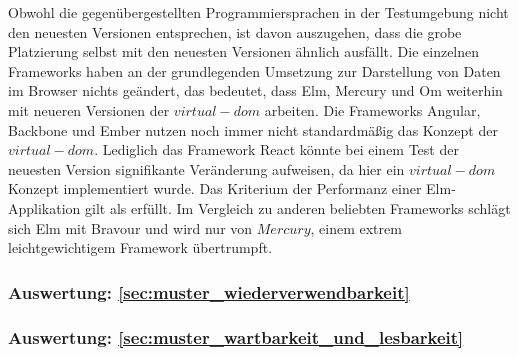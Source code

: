 Obwohl die gegenübergestellten Programmiersprachen in der Testumgebung nicht den neuesten Versionen entsprechen, ist davon auszugehen, dass die grobe Platzierung selbst mit den neuesten Versionen ähnlich ausfällt. Die einzelnen Frameworks haben an der grundlegenden Umsetzung zur Darstellung von Daten im Browser nichts geändert, das bedeutet, dass Elm, Mercury und Om weiterhin mit neueren Versionen der $virtual-dom$ arbeiten. Die Frameworks Angular, Backbone und Ember nutzen noch immer nicht standardmäßig das Konzept der $virtual-dom$. Lediglich das Framework React könnte bei einem Test der neuesten Version signifikante Veränderung aufweisen, da hier ein $virtual-dom$ Konzept implementiert wurde.
Das Kriterium der Performanz einer Elm-Applikation gilt als erfüllt. Im Vergleich zu anderen beliebten Frameworks schlägt sich Elm mit Bravour und wird nur von $Mercury$, einem extrem leichtgewichtigem Framework übertrumpft.




\subsubsection{Auswertung: \ref{sec:muster_wiederverwendbarkeit} }



\subsubsection{Auswertung: \ref{sec:muster_wartbarkeit_und_lesbarkeit} }


